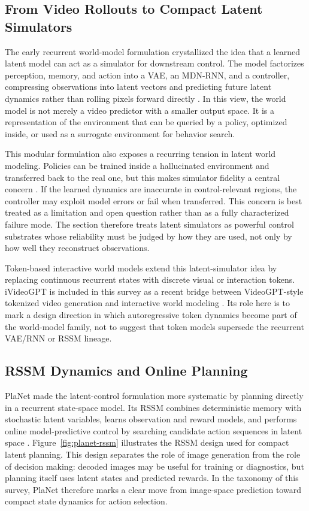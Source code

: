 \subsection{From Video Rollouts to Compact Latent Simulators}

The early recurrent world-model formulation crystallized the idea that a learned latent model can act as a simulator for downstream control. The model factorizes perception, memory, and action into a VAE, an MDN-RNN, and a controller, compressing observations into latent vectors and predicting future latent dynamics rather than rolling pixels forward directly \cite{ha2018_world_models_prov}. In this view, the world model is not merely a video predictor with a smaller output space. It is a representation of the environment that can be queried by a policy, optimized inside, or used as a surrogate environment for behavior search.

This modular formulation also exposes a recurring tension in latent world modeling. Policies can be trained inside a hallucinated environment and transferred back to the real one, but this makes simulator fidelity a central concern \cite{ha2018_world_models_prov}. If the learned dynamics are inaccurate in control-relevant regions, the controller may exploit model errors or fail when transferred. This concern is best treated as a limitation and open question rather than as a fully characterized failure mode. The section therefore treats latent simulators as powerful control substrates whose reliability must be judged by how they are used, not only by how well they reconstruct observations.

Token-based interactive world models extend this latent-simulator idea by replacing continuous recurrent states with discrete visual or interaction tokens. iVideoGPT is included in this survey as a recent bridge between VideoGPT-style tokenized video generation and interactive world modeling \cite{wu2024ivideogpt}. Its role here is to mark a design direction in which autoregressive token dynamics become part of the world-model family, not to suggest that token models supersede the recurrent VAE/RNN or RSSM lineage.

\subsection{RSSM Dynamics and Online Planning}

PlaNet made the latent-control formulation more systematic by planning directly in a recurrent state-space model. Its RSSM combines deterministic memory with stochastic latent variables, learns observation and reward models, and performs online model-predictive control by searching candidate action sequences in latent space \cite{hafner2019_planet_prov}. Figure~\ref{fig:planet-rssm} illustrates the RSSM design used for compact latent planning. This design separates the role of image generation from the role of decision making: decoded images may be useful for training or diagnostics, but planning itself uses latent states and predicted rewards. In the taxonomy of this survey, PlaNet therefore marks a clear move from image-space prediction toward compact state dynamics for action selection.

